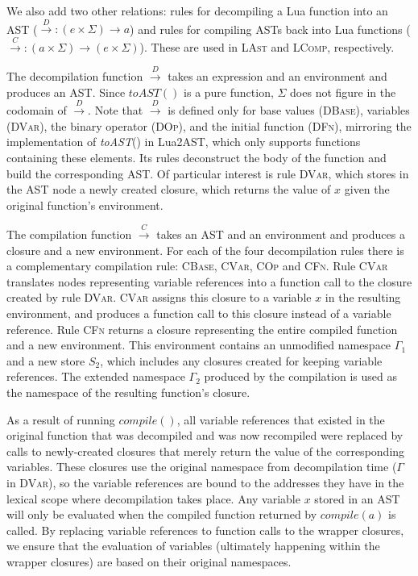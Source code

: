 \documentclass[english]{llncs}
\begin{document}
We also add two other relations: rules for decompiling a Lua function
into an AST ($\overset{D}{\rightarrow}:(e\times\Sigma)\rightarrow a$)
and rules for compiling ASTs back into Lua functions ($\overset{C}{\rightarrow}:(a\times\Sigma)\rightarrow(e\times\Sigma)$).
These are used in \textsc{LAst} and \textsc{LComp}, respectively.

The decompilation function $\overset{D}{\rightarrow}$ takes an expression
and an environment and produces an AST. Since $toAST()$ is a pure
function, $\Sigma$ does not figure in the codomain of $\overset{D}{\rightarrow}$.
Note that $\overset{D}{\rightarrow}$ is defined only for base values
(\textsc{DBase}), variables (\textsc{DVar}), the binary operator (\textsc{DOp}),
and the initial function (\textsc{DFn}), mirroring the implementation
of \emph{toAST}() in Lua2AST, which only supports functions containing
these elements. Its rules deconstruct the body of the function and
build the corresponding AST. Of particular interest is rule \textsc{DVar},
which stores in the AST node a newly created closure, which returns
the value of $x$ given the original function's environment.

The compilation function $\overset{C}{\rightarrow}$ takes an AST
and an environment and produces a closure and a new environment. For
each of the four decompilation rules there is a complementary compilation
rule: \textsc{CBase}, \textsc{CVar}, \textsc{COp} and \textsc{CFn}.
Rule \textsc{CVar} translates nodes representing variable references
into a function call to the closure created by rule \textsc{DVar}.
\textsc{CVar} assigns this closure to a variable $x$ in the resulting
environment, and produces a function call to this closure instead
of a variable reference. Rule \textsc{CFn} returns a closure representing
the entire compiled function and a new environment. This environment
contains an unmodified namespace $\Gamma_{1}$ and a new store $S_{2}$,
which includes any closures created for keeping variable references.
The extended namespace $\Gamma_{2}$ produced by the compilation is
used as the namespace of the resulting function's closure.

As a result of running $compile()$, all variable references that
existed in the original function that was decompiled and was now recompiled
were replaced by calls to newly-created closures that merely return
the value of the corresponding variables. These closures use the original
namespace from decompilation time ($\Gamma$ in \textsc{DVar}), so
the variable references are bound to the addresses they have in the
lexical scope where decompilation takes place. Any variable $x$ stored
in an AST will only be evaluated when the compiled function returned
by $compile(a)$ is called. By replacing variable references to function
calls to the wrapper closures, we ensure that the evaluation of variables
(ultimately happening within the wrapper closures) are based on their
original namespaces.
\end{document}
